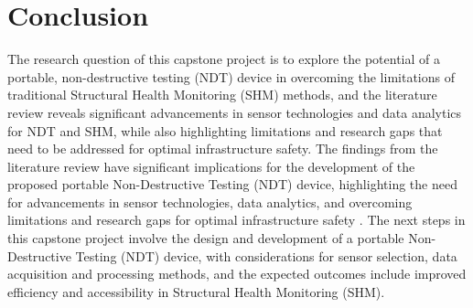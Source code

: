\documentclass[journal, a4paper]{IEEEtran}
\begin{document}
\section{Conclusion}
The research question of this capstone project is to explore the potential of a portable,
non-destructive testing (NDT) device in overcoming the limitations of traditional Structural Health Monitoring (SHM) methods,
and the literature review reveals significant advancements in sensor technologies and data analytics for NDT and SHM,
while also highlighting limitations and research gaps that need to be addressed for optimal infrastructure safety.
The findings from the literature review have significant implications for the development of the
proposed portable Non-Destructive Testing (NDT) device, highlighting the need for advancements in sensor technologies,
data analytics, and overcoming limitations and research gaps for optimal infrastructure safety \cite{Udell2018} \cite{Meier2018}.
The next steps in this capstone project involve the design and development of a portable
Non-Destructive Testing (NDT) device, with considerations for sensor selection, data acquisition and processing methods,
and the expected outcomes include improved efficiency and accessibility in Structural Health Monitoring (SHM).









\ifCLASSOPTIONcaptionsoff
  \newpage
\fi






\end{document}
